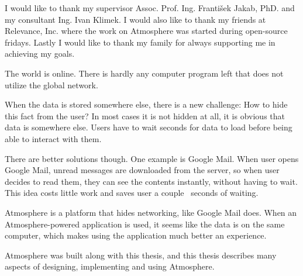 \documentclass[]{tukethesis}
\begin{document}
\declaration

\acknowledgement %
I would like to thank my supervisor Assoc. Prof. Ing. František Jakab, PhD. and my consultant Ing. Ivan Klimek. I would also like to thank my friends at Relevance, Inc. where the work on Atmosphere was started during open-source fridays. Lastly I would like to thank my family for always supporting me in achieving my goals.
\endacknowledgement

\preface %
The world is online. There is hardly any computer program left that does not utilize the global network. 

When the data is stored somewhere else, there is a new challenge: How to hide this fact from the user? In most cases it is not hidden at all, it is obvious that data is somewhere else. Users have to wait seconds for data to load before being able to interact with them.

There are better solutions though. One example is Google Mail. When user opens Google Mail, unread messages are downloaded from the server, so when user decides to read them, they can see the contents instantly, without having to wait. This idea costs little work and saves user a couple   seconds of waiting.

Atmosphere is a platform that hides networking, like Google Mail does. When an Atmosphere-powered application is used, it seems like the data is on the same computer, which makes using the application much better an experience.

Atmosphere was built along with this thesis, and this thesis describes many aspects of designing, implementing and using Atmosphere.
\endpreface

\thispagestyle{empty}
\tableofcontents
\newpage

\thispagestyle{empty}
\listoffigures
\newpage

\thispagestyle{empty}
\listoftables
\newpage
\end{document}
